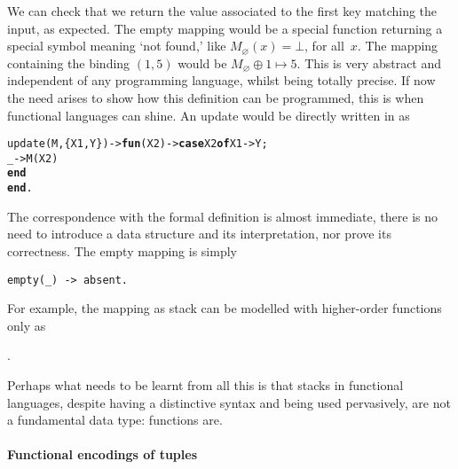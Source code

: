We can check that we return the value associated to the first key
matching the input, as expected. The empty mapping would be a special
function returning a special symbol meaning `not found,' like
\(M_\varnothing(x) = \bot\), for all~\(x\). The mapping containing the
binding \((1,5)\) would be \(M_\varnothing \mathrel{\oplus} 1 \mapsto
5\). This is very abstract and independent of any programming
language, whilst being totally precise. If now the need arises to show
how this definition can be programmed, this is when functional
languages can shine. An update would be directly written in \Erlang as
\begin{alltt}
update(M,\{X1,Y\}) -> \textbf{fun}(X2) -> \textbf{case} X2 \textbf{of} X1 -> Y; 
                                           \_ -> M(X2) 
                               \textbf{end}
                    \textbf{end}.
\end{alltt}
The correspondence with the formal definition is almost immediate,
there is no need to introduce a data structure and its interpretation,
nor prove its correctness. The empty mapping is simply
\begin{verbatim}
empty(_) -> absent.
\end{verbatim}
For example, the mapping as stack \erlcode{[\{a,0\},\{b,1\},\{a,5\}]}
can be modelled with higher\hyp{}order functions only as
\begin{center}
.
\end{center}
Perhaps what needs to be learnt from all this is that stacks in
functional languages, despite having a distinctive syntax and being
used pervasively, are not a fundamental data type: functions are.

\paragraph{Functional encodings of tuples}

